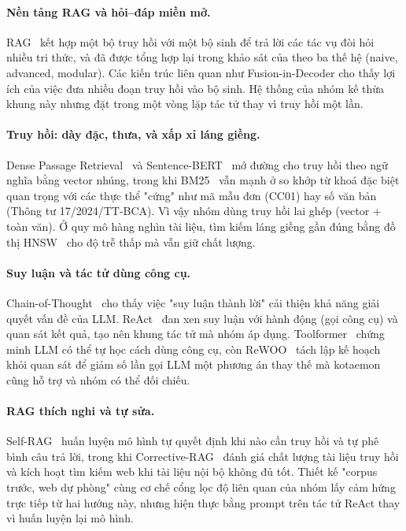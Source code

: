 \documentclass[11pt]{article}
\begin{document}
\paragraph{Nền tảng RAG và hỏi--đáp miền mở.}
RAG~\citep{lewis2020rag} kết hợp một bộ truy hồi với một bộ sinh để trả lời các tác vụ đòi
hỏi nhiều tri thức, và đã được tổng hợp lại trong khảo sát của \citet{gao2023ragsurvey}
theo ba thế hệ (naive, advanced, modular). Các kiến trúc liên quan như Fusion-in-Decoder
\citep{izacard2021fid} cho thấy lợi ích của việc đưa nhiều đoạn truy hồi vào bộ sinh. Hệ
thống của nhóm kế thừa khung này nhưng đặt trong một vòng lặp tác tử thay vì truy hồi
một lần.

\paragraph{Truy hồi: dày đặc, thưa, và xấp xỉ láng giềng.}
Dense Passage Retrieval~\citep{karpukhin2020dpr} và Sentence-BERT~\citep{reimers2019sbert}
mở đường cho truy hồi theo ngữ nghĩa bằng vector nhúng, trong khi BM25~\citep{robertson2009bm25}
vẫn mạnh ở so khớp từ khoá   đặc biệt quan trọng với các thực thể "cứng" như mã mẫu đơn
(CC01) hay số văn bản (Thông tư 17/2024/TT-BCA). Vì vậy nhóm dùng truy hồi lai
ghép (vector + toàn văn). Ở quy mô hàng nghìn tài liệu, tìm kiếm láng giềng gần đúng bằng
đồ thị HNSW~\citep{malkov2020hnsw} cho độ trễ thấp mà vẫn giữ chất lượng.

\paragraph{Suy luận và tác tử dùng công cụ.}
Chain-of-Thought~\citep{wei2022cot} cho thấy việc "suy luận thành lời" cải thiện khả năng
giải quyết vấn đề của LLM. ReAct~\citep{yao2023react} đan xen suy luận với hành
động (gọi công cụ) và quan sát kết quả, tạo nên khung tác tử mà nhóm áp dụng.
Toolformer~\citep{schick2023toolformer} chứng minh LLM có thể tự học cách dùng công cụ, còn
ReWOO~\citep{xu2023rewoo} tách lập kế hoạch khỏi quan sát để giảm số lần gọi LLM   một
phương án thay thế mà kotaemon cũng hỗ trợ và nhóm có thể đối chiếu.

\paragraph{RAG thích nghi và tự sửa.}
Self-RAG~\citep{asai2024selfrag} huấn luyện mô hình tự quyết định khi nào cần truy hồi và tự
phê bình câu trả lời, trong khi Corrective-RAG~\citep{yan2024crag} đánh giá chất lượng tài
liệu truy hồi và kích hoạt tìm kiếm web khi tài liệu nội bộ không đủ tốt. Thiết kế "corpus
trước, web dự phòng" cùng cơ chế cổng lọc độ liên quan của nhóm lấy cảm hứng trực tiếp
từ hai hướng này, nhưng hiện thực bằng prompt trên tác tử ReAct thay vì huấn luyện
lại mô hình.
\end{document}
